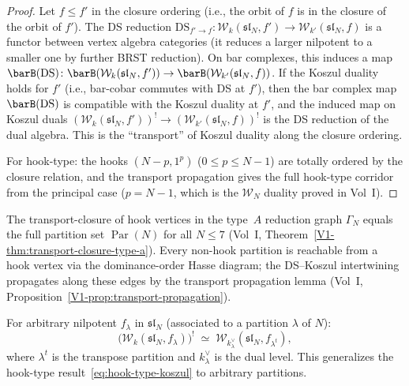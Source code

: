 \begin{proof}
Let $f\le f'$ in the closure ordering (i.e., the orbit of $f$
is in the closure of the orbit of $f'$). The DS reduction
$\mathrm{DS}_{f'\to f}\colon
\mathcal{W}_k(\mathfrak{sl}_N,f')\to
\mathcal{W}_{k'}(\mathfrak{sl}_N,f)$
is a functor between vertex algebra categories (it reduces
a larger nilpotent to a smaller one by further BRST
reduction). On bar complexes, this induces a map
$\barB(\mathrm{DS})\colon
\barB(\mathcal{W}_k(\mathfrak{sl}_N,f'))\to
\barB(\mathcal{W}_{k'}(\mathfrak{sl}_N,f))$.
If the Koszul duality holds for $f'$ (i.e., bar-cobar
commutes with DS at $f'$), then the bar complex map
$\barB(\mathrm{DS})$ is compatible with the Koszul
duality at $f'$, and the induced map on Koszul duals
$(\mathcal{W}_k(\mathfrak{sl}_N,f'))^!
\to(\mathcal{W}_{k'}(\mathfrak{sl}_N,f))^!$
is the DS reduction of the dual algebra. This is
the ``transport'' of Koszul duality along the closure
ordering.

For hook-type: the hooks $(N-p,1^p)$ ($0\le p\le N-1$)
are totally ordered by the closure relation, and the
transport propagation gives the full hook-type corridor
from the principal case ($p=N-1$, which is the
$\mathcal{W}_N$ duality proved in Vol~I).
\end{proof}

\begin{construction}
The transport-closure of hook vertices in the type~$A$ reduction graph $\Gamma_N$ equals the full partition set $\operatorname{Par}(N)$ for all $N \leq 7$ (Vol~I, Theorem~\ref{V1-thm:transport-closure-type-a}). Every non-hook partition is reachable from a hook vertex via the dominance-order Hasse diagram; the DS--Koszul intertwining propagates along these edges by the transport propagation lemma (Vol~I, Proposition~\ref{V1-prop:transport-propagation}).
\end{construction}

\begin{conjecture}
For arbitrary nilpotent $f_\lambda$ in $\mathfrak{sl}_N$
(associated to a partition $\lambda$ of $N$):
\begin{equation}
\bigl(\mathcal{W}_k(\mathfrak{sl}_N,f_\lambda)\bigr)^!
\;\simeq\;
\mathcal{W}_{k^\vee_\lambda}(\mathfrak{sl}_N,f_{\lambda^t}),
\end{equation}
where $\lambda^t$ is the transpose partition and
$k^\vee_\lambda$ is the dual level. This generalizes
the hook-type result~\eqref{eq:hook-type-koszul} to
arbitrary partitions.
\end{conjecture}

